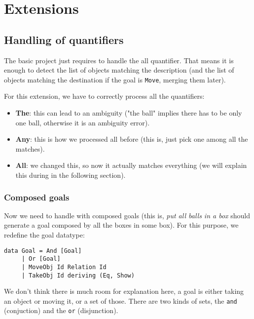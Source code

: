 \documentclass[11pt]{article}
\begin{document}
	\section{Extensions}

	\subsection{Handling of quantifiers}

          The basic project just requires to handle the all quantifier.
          That means it is enough to detect the list of objects matching the description
          (and the list of objects matching the destination if the goal is \texttt{Move},
          merging them later).

          For this extension, we have to correctly process all the quantifiers:

          \begin{itemize}
            \item {\bf The}: this can lead to an ambiguity ("the ball" implies there has
            to be only one ball, otherwise it is an ambiguity error).
            \item {\bf Any}: this is how we processed all before (this is, just pick one
            among all the matches).
            \item {\bf All}: we changed this, so now it actually matches everything 
            (we will explain this during in the following section).
          \end{itemize}

          \subsubsection{Composed goals}
          Now we need to handle with composed goals (this is, \textit{put all balls
          in a box} should generate a goal composed by all the boxes in some box). For 
          this purpose, we redefine the goal datatype:

\begin{verbatim}
data Goal = And [Goal]
     | Or [Goal]
     | MoveObj Id Relation Id
     | TakeObj Id deriving (Eq, Show)
\end{verbatim}

          We don't think there is much room for explanation here, a goal is either 
          taking an object or moving it, or a set of those. There are two kinds of 
          sets, the \texttt{and} (conjuction) and the \texttt{or} (disjunction).
\end{document}
